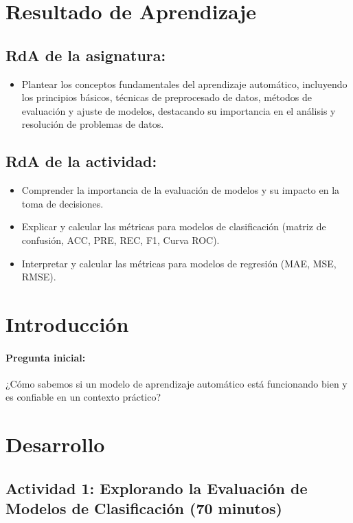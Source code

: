 \documentclass[a4,11pt]{aleph-notas}
\begin{document}
\encabezado


\section*{Resultado de Aprendizaje}

\subsection*{RdA de la asignatura:}
\begin{itemize}[leftmargin=*]
    \item Plantear los conceptos fundamentales del aprendizaje automático, incluyendo los principios básicos, técnicas de preprocesado de datos, métodos de evaluación y ajuste de modelos, destacando su importancia en el análisis y resolución de problemas de datos.
\end{itemize}

\subsection*{RdA de la actividad:}
    \begin{itemize}[leftmargin=*]
        \item Comprender la importancia de la evaluación de modelos y su impacto en la toma de decisiones.
        \item Explicar y calcular las métricas para modelos de clasificación (matriz de confusión, ACC, PRE, REC, F1, Curva ROC).
        \item Interpretar y calcular las métricas para modelos de regresión (MAE, MSE, RMSE).
    \end{itemize}

\section*{Introducción}

\paragraph{Pregunta inicial:} 
¿Cómo sabemos si un modelo de aprendizaje automático está funcionando bien y es confiable en un contexto práctico?


\section*{Desarrollo}

\subsection*{Actividad 1: Explorando la Evaluación de Modelos de Clasificación (70 minutos)}
\end{document}
